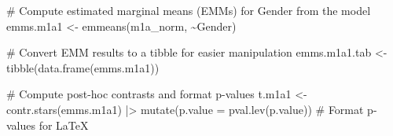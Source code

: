 \documentclass[
  bookmarksnumbered]{article}
\newenvironment{Shaded}{\begin{snugshade}}{\end{snugshade}}
\newcommand{\AttributeTok}[1]{\textcolor[rgb]{0.80,0.80,0.80}{#1}}
\newcommand{\CommentTok}[1]{\textcolor[rgb]{0.50,0.62,0.50}{#1}}
\newcommand{\FunctionTok}[1]{\textcolor[rgb]{0.94,0.94,0.56}{#1}}
\newcommand{\NormalTok}[1]{\textcolor[rgb]{0.80,0.80,0.80}{#1}}
\newcommand{\OtherTok}[1]{\textcolor[rgb]{0.94,0.94,0.56}{#1}}
\newcommand{\SpecialCharTok}[1]{\textcolor[rgb]{0.86,0.64,0.64}{#1}}
\begin{document}
\begin{Shaded}
\begin{Highlighting}[]
\CommentTok{\# Compute estimated marginal means (EMMs) for Gender from the model}
\NormalTok{emms.m1a1 }\OtherTok{\textless{}{-}} \FunctionTok{emmeans}\NormalTok{(m1a\_norm, }\SpecialCharTok{\textasciitilde{}}\NormalTok{Gender)}

\CommentTok{\# Convert EMM results to a tibble for easier manipulation}
\NormalTok{emms.m1a1.tab }\OtherTok{\textless{}{-}} \FunctionTok{tibble}\NormalTok{(}\FunctionTok{data.frame}\NormalTok{(emms.m1a1))}

\CommentTok{\# Compute post{-}hoc contrasts and format p{-}values}
\NormalTok{t.m1a1 }\OtherTok{\textless{}{-}} \FunctionTok{contr.stars}\NormalTok{(emms.m1a1) }\SpecialCharTok{|\textgreater{}}
  \FunctionTok{mutate}\NormalTok{(}\AttributeTok{p.value =} \FunctionTok{pval.lev}\NormalTok{(p.value)) }\CommentTok{\# Format p{-}values for LaTeX}


\end{Highlighting}
\end{Shaded}
\end{document}
